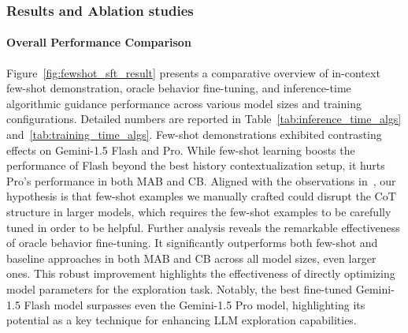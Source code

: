 \subsubsection{Results and Ablation studies}
\label{subsubsec: results}

\paragraph{Overall Performance Comparison} 

Figure~\ref{fig:fewshot_sft_result} presents a comparative overview of in-context few-shot demonstration, oracle behavior fine-tuning, and inference-time algorithmic guidance performance across various model sizes and training configurations. Detailed numbers are reported in Table~\ref{tab:inference_time_algs} and~\ref{tab:training_time_algs}.
Few-shot demonstrations exhibited contrasting effects on Gemini-1.5 Flash and Pro. While few-shot learning boosts the performance of Flash beyond the best history contextualization setup, it hurts Pro's performance in both MAB and CB. Aligned with the observations in~\citet{zheng2024natural,guo2025deepseek}, our hypothesis is that few-shot examples we manually crafted could disrupt the CoT structure in larger models, which requires the few-shot examples to be carefully tuned in order to be helpful.
Further analysis reveals the remarkable effectiveness of oracle behavior fine-tuning. It significantly outperforms both few-shot and baseline approaches in both MAB and CB across all model sizes, even larger ones.
This robust improvement highlights the effectiveness of directly optimizing model parameters for the exploration task. Notably, the best fine-tuned Gemini-1.5 Flash model surpasses even the Gemini-1.5 Pro model, highlighting its potential as a key technique for enhancing LLM exploration capabilities.

